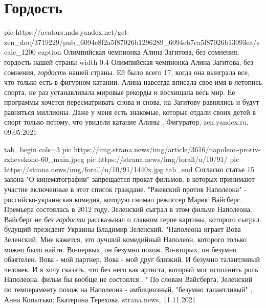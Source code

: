  
 
 
 
 
\chapter{Гордость}
\label{sec:slova.gordost}

\ifcmt
  pic https://avatars.mds.yandex.net/get-zen_doc/3719229/pub_6094e8f2a5f87026b1296289_6094eb7ca5f87026b13093ea/scale_1200
	caption Олимпийская чемпионка Алина Загитова, без сомнения, гордость нашей страны
	width 0.4
\fi
Олимпийская чемпионка Алина Загитова, без сомнения, \emph{гордость} нашей страны. Ей
было всего 17, когда она выиграла все, что только есть в фигурном катании.
Алина навсегда вписала свое имя в летопись спорта, не раз устанавливала мировые
рекорды и восхищала весь мир. Ее программы хочется пересматривать снова и
снова, на Загитову равнялись и будут равняться миллионы. Даже у меня есть
знакомые, которые отдали своих детей в спорт только потому, что увидели катание
Алины
, 
Фигуратор, zen.yandex.ru, 09.05.2021

\ifcmt
  tab_begin cols=3
     pic https://img.strana.news/img/article/3616/napoleon-protiv-rzhevskoho-60_main.jpeg
     pic https://strana.news/img/forall/u/10/91/%
		 pic https://strana.news/img/forall/u/10/91/1440x.jpg
  tab_end
\fi
Согласно статье 15 закона "О кинематографии" запрещается прокат фильмов, в
которых принимают участие включенные в этот список граждане.  "Ржевский против
Наполеона" - российско-украинская комедия, которую снимал режиссер Марюс
Вайсберг. Премьера состоялась в 2012 году. Зеленский сыграл в этом фильме
Наполеона.  Вайсберг \emph{не без гордости} рассказывал о главном герое
картины, которого сыграл будущий президент Украины Владимир Зеленский.
"Наполеона играет Вова Зеленский. Мне кажется, это лучший комедийный Наполеон,
которого только можно было найти. Во-первых, он безумно похож. Во-вторых, он
безумно обаятелен. Вова - мой партнер, Вова - мой друг близкий. И безумно
талантливый человек. И я хочу сказать, что без него как артиста, который мог
исполнить роль Наполеона, фильм бы вообще не состоялся..." По словам Вайсберга,
Зеленский по темпераменту похож на Наполеона - амбициозный, "безумно
талантливый"
, 
Анна Копытько; Екатерина Терехова, strana.news, 11.11.2021 
